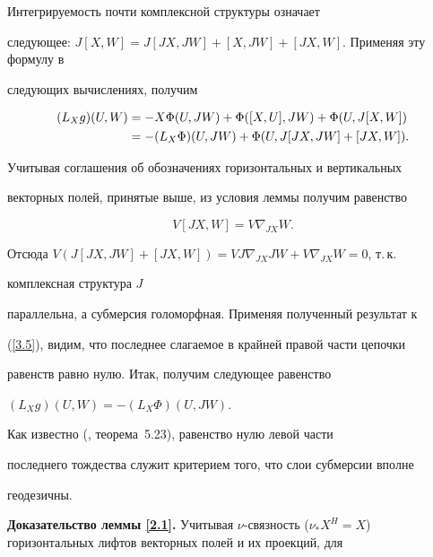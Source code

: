 \begin{pf}


Интегрируемость почти комплексной структуры означает


следующее: $J[X,W]=J[JX,JW]+[X,JW]+[JX,W]$. Применяя эту формулу в


следующих вычислениях, получим


\begin{align}


(L_Xg)(U,W)&=-X\Phi (U,JW)+\Phi ([X,U],JW)+\Phi (U,J[X,W])


\notag\\


&=-(L_{X}\Phi )(U,JW)+\Phi (U,J[JX,JW]+[JX,W]).


\label{3.5}


\end{align}


Учитывая соглашения об обозначениях горизонтальных и вертикальных


векторных полей, принятые выше, из условия леммы получим равенство


\begin{equation}


V[JX,W]=V\nabla_{JX}W.


\label{3.6}


\end{equation}


Отсюда $V(J[JX,JW]+[JX,W])=VJ\nabla_{JX}JW+V\nabla_{JX}W=0$, т.\,к.


комплексная структура $J$


параллельна, а субмерсия голоморфная. Применяя полученный результат к


(\ref{3.5}), видим, что последнее слагаемое в крайней правой части цепочки


равенств равно нулю. Итак, получим следующее равенство


$(L_Xg)(U,W)=-(L_X\Phi )(U,JW)$.


Как известно (\cite{Ton}, теорема~5.23), равенство нулю левой части


последнего тождества служит критерием того, что слои субмерсии вполне


геодезичны.


\end{pf}





{\bf Доказательство леммы \ref{2.1}.} Учитывая $\nu$-связность ($\nu


_*X^H=X$) горизонтальных лифтов векторных полей и их проекций, для


